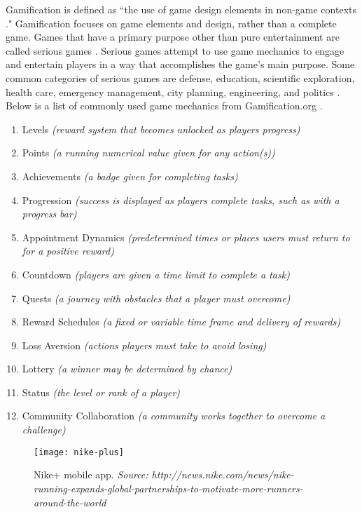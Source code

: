 Gamification is defined as ``the use of game design elements in non-game contexts \cite{Deterding}." Gamification focuses on game elements and design, rather than a complete game. Games that have a primary purpose other than pure entertainment are called serious games \cite{Serious_Games}. Serious games attempt to use game mechanics to engage and entertain players in a way that accomplishes the game's main purpose. Some common categories of serious games are defense, education, scientific exploration, health care, emergency management, city planning, engineering, and politics \cite{Zyda}. Below is a list of commonly used game mechanics from Gamification.org \cite{gamification}. 

\begin{enumerate}
  \item Levels \textit{(reward system that becomes unlocked as players progress)}
  \item Points \textit{(a running numerical value given for any action(s))}
  \item Achievements \textit{(a badge given for completing tasks)}
  \item Progression \textit{(success is displayed as players complete tasks, such as with a progress bar)}
  \item Appointment Dynamics \textit{(predetermined times or places users must return to for a positive reward)}
  \item Countdown \textit{(players are given a time limit to complete a task)}
  \item Quests \textit{(a journey with obstacles that a player must overcome)}
  \item Reward Schedules \textit{(a fixed or variable time frame and delivery of rewards)}
  \item Loss Aversion \textit{(actions players must take to avoid losing)}
  \item Lottery \textit{(a winner may be determined by chance)}
  \item Status \textit{(the level or rank of a player)}
  \item Community Collaboration \textit{(a community works together to overcome a challenge)}

\end{enumerate}

\begin{figure}[h]
\centering
\texttt{[image: nike-plus]}
\caption{Nike+ mobile app. \textit{Source: http://news.nike.com/news/nike-running-expands-global-partnerships-to-motivate-more-runners-around-the-world}}
\label{nike-plus}
\end{figure}

